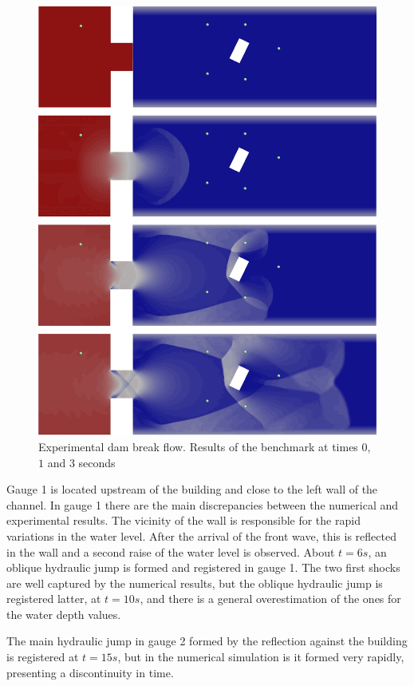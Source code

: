 \begin{figure}
\centering
\includegraphics[width=\textwidth]{img/eulerian/exp/results.png}
\caption{Experimental dam break flow. Results of the benchmark at times $0$, $1$ and $3$ seconds}
\label{experiment_plots}
\end{figure}


Gauge 1 is located upstream of the building and close to the left wall of the channel. In gauge 1 there are the main discrepancies between the numerical and experimental results. The vicinity of the wall is responsible for the rapid variations in the water level. After the arrival of the front wave, this is reflected in the wall and a second raise of the water level is observed. About $t=6s$, an oblique hydraulic jump is formed and registered in gauge 1. The two first shocks are well captured by the numerical results, but the oblique hydraulic jump is registered latter, at $t=10s$, and there is a general overestimation of the ones for the water depth values.

The main hydraulic jump in gauge 2 formed by the reflection against the building is registered at $t=15s$, but in the numerical simulation is it formed very rapidly, presenting a discontinuity in time.

